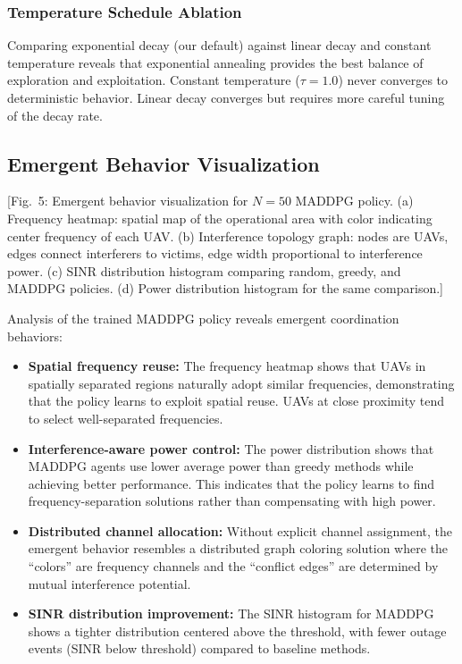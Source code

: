 \documentclass[conference]{IEEEtran}
\begin{document}
\subsubsection{Temperature Schedule Ablation}
Comparing exponential decay (our default) against linear decay and constant temperature reveals that exponential annealing provides the best balance of exploration and exploitation. Constant temperature ($\tau = 1.0$) never converges to deterministic behavior. Linear decay converges but requires more careful tuning of the decay rate.

\subsection{Emergent Behavior Visualization}

[Fig.~5: Emergent behavior visualization for $N=50$ MADDPG policy. (a) Frequency heatmap: spatial map of the operational area with color indicating center frequency of each UAV. (b) Interference topology graph: nodes are UAVs, edges connect interferers to victims, edge width proportional to interference power. (c) SINR distribution histogram comparing random, greedy, and MADDPG policies. (d) Power distribution histogram for the same comparison.]

Analysis of the trained MADDPG policy reveals emergent coordination behaviors:

\begin{itemize}
    \item \textbf{Spatial frequency reuse:} The frequency heatmap shows that UAVs in spatially separated regions naturally adopt similar frequencies, demonstrating that the policy learns to exploit spatial reuse. UAVs at close proximity tend to select well-separated frequencies.
    
    \item \textbf{Interference-aware power control:} The power distribution shows that MADDPG agents use lower average power than greedy methods while achieving better performance. This indicates that the policy learns to find frequency-separation solutions rather than compensating with high power.
    
    \item \textbf{Distributed channel allocation:} Without explicit channel assignment, the emergent behavior resembles a distributed graph coloring solution where the ``colors'' are frequency channels and the ``conflict edges'' are determined by mutual interference potential.
    
    \item \textbf{SINR distribution improvement:} The SINR histogram for MADDPG shows a tighter distribution centered above the threshold, with fewer outage events (SINR below threshold) compared to baseline methods.
\end{itemize}
\end{document}
